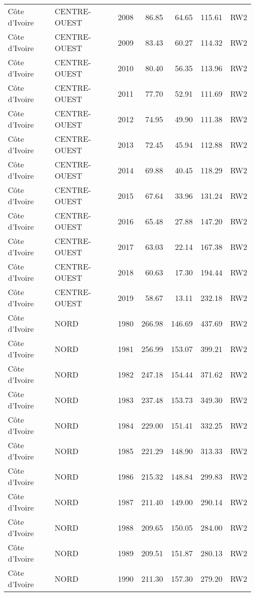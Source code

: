 \begin{longtable}{lllrrrl}
  C\^{o}te d'Ivoire & CENTRE-OUEST & 2008 & 86.85 & 64.65 & 115.61 & RW2 \\ 
  C\^{o}te d'Ivoire & CENTRE-OUEST & 2009 & 83.43 & 60.27 & 114.32 & RW2 \\ 
  C\^{o}te d'Ivoire & CENTRE-OUEST & 2010 & 80.40 & 56.35 & 113.96 & RW2 \\ 
  C\^{o}te d'Ivoire & CENTRE-OUEST & 2011 & 77.70 & 52.91 & 111.69 & RW2 \\ 
  C\^{o}te d'Ivoire & CENTRE-OUEST & 2012 & 74.95 & 49.90 & 111.38 & RW2 \\ 
  C\^{o}te d'Ivoire & CENTRE-OUEST & 2013 & 72.45 & 45.94 & 112.88 & RW2 \\ 
  C\^{o}te d'Ivoire & CENTRE-OUEST & 2014 & 69.88 & 40.45 & 118.29 & RW2 \\ 
  C\^{o}te d'Ivoire & CENTRE-OUEST & 2015 & 67.64 & 33.96 & 131.24 & RW2 \\ 
  C\^{o}te d'Ivoire & CENTRE-OUEST & 2016 & 65.48 & 27.88 & 147.20 & RW2 \\ 
  C\^{o}te d'Ivoire & CENTRE-OUEST & 2017 & 63.03 & 22.14 & 167.38 & RW2 \\ 
  C\^{o}te d'Ivoire & CENTRE-OUEST & 2018 & 60.63 & 17.30 & 194.44 & RW2 \\ 
  C\^{o}te d'Ivoire & CENTRE-OUEST & 2019 & 58.67 & 13.11 & 232.18 & RW2 \\ 
  C\^{o}te d'Ivoire & NORD & 1980 & 266.98 & 146.69 & 437.69 & RW2 \\ 
  C\^{o}te d'Ivoire & NORD & 1981 & 256.99 & 153.07 & 399.21 & RW2 \\ 
  C\^{o}te d'Ivoire & NORD & 1982 & 247.18 & 154.44 & 371.62 & RW2 \\ 
  C\^{o}te d'Ivoire & NORD & 1983 & 237.48 & 153.73 & 349.30 & RW2 \\ 
  C\^{o}te d'Ivoire & NORD & 1984 & 229.00 & 151.41 & 332.25 & RW2 \\ 
  C\^{o}te d'Ivoire & NORD & 1985 & 221.29 & 148.90 & 313.33 & RW2 \\ 
  C\^{o}te d'Ivoire & NORD & 1986 & 215.32 & 148.84 & 299.83 & RW2 \\ 
  C\^{o}te d'Ivoire & NORD & 1987 & 211.40 & 149.00 & 290.14 & RW2 \\ 
  C\^{o}te d'Ivoire & NORD & 1988 & 209.65 & 150.05 & 284.00 & RW2 \\ 
  C\^{o}te d'Ivoire & NORD & 1989 & 209.51 & 151.87 & 280.13 & RW2 \\ 
  C\^{o}te d'Ivoire & NORD & 1990 & 211.30 & 157.30 & 279.20 & RW2 \\ 

\end{longtable}
